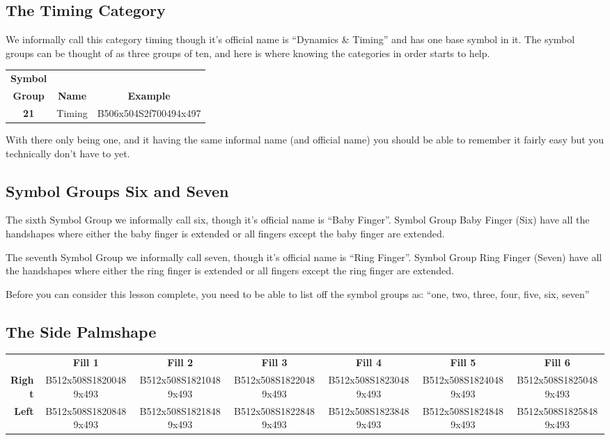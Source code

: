 \documentclass{article}
\begin{document}
\subsection{The Timing Category}

We informally call this category timing though it's official name is ``Dynamics \& Timing'' and has one base symbol in it.
The symbol groups can be thought of as three groups of ten, and here is where knowing the categories in order starts to help.

\begin{center}
\begin{tabular}{ccc}
\textbf{Symbol}\\
\textbf{Group}&\textbf{Name}&\textbf{Example}\\
\textbf{21}&Timing&B506x504S2f700494x497\\
\end{tabular}
\end{center}

With there only being one, and it having the same informal name (and official name) you should be able to remember it fairly easy but you technically don't have to yet.

\subsection{Symbol Groups Six and Seven}

The sixth Symbol Group we informally call six, though it's official name is ``Baby Finger''.
Symbol Group Baby Finger (Six) have all the handshapes where either the baby finger is extended or all fingers except the baby finger are extended.

The seventh Symbol Group we informally call seven, though it's official name is ``Ring Finger''.
Symbol Group Ring Finger (Seven) have all the handshapes where either the ring finger is extended or all fingers except the ring finger are extended.

Before you can consider this lesson complete, you need to be able to list off the symbol groups as:
``one, two, three, four, five, six, seven''

\subsection{The Side Palmshape}

\begin{center}
\begin{tabular}{r*{6}{c}}
&\textbf{Fill 1}&\textbf{Fill 2}&\textbf{Fill 3}&\textbf{Fill 4}&\textbf{Fill 5}&\textbf{Fill 6}\\
\textbf{Right}&
B512x508S18200489x493&
B512x508S18210489x493&
B512x508S18220489x493&
B512x508S18230489x493&
B512x508S18240489x493&
B512x508S18250489x493\\
\textbf{Left}&
B512x508S18208489x493&
B512x508S18218489x493&
B512x508S18228489x493&
B512x508S18238489x493&
B512x508S18248489x493&
B512x508S18258489x493\\
\end{tabular}
\end{center}
\end{document}
